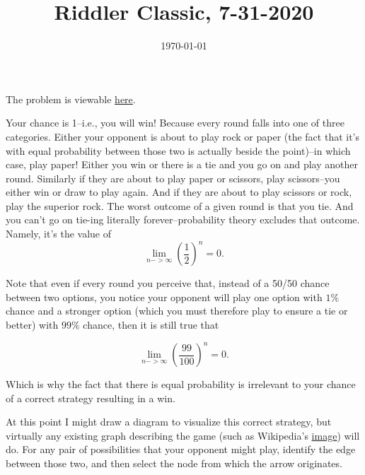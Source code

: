 \documentclass[a4paper,12pt,twoside]{book}
\title{Riddler Classic, 7-31-2020}
\date{\today}
\begin{document}
\maketitle

The problem is viewable \href{https://fivethirtyeight.com/features/can-you-cheat-at-rock-paper-scissors/}{here}.

Your chance is 1--i.e., you will win! Because every round falls into one of three categories. Either your opponent is about to play rock or paper (the fact that it's with equal probability between those two is actually beside the point)--in which case, play paper! Either you win or there is a tie and you go on and play another round. Similarly if they are about to play paper or scissors, play scissors--you either win or draw to play again. And if they are about to play scissors or rock, play the superior rock. The worst outcome of a given round is that you tie. And you can't go on tie-ing literally forever--probability theory excludes that outcome. Namely, it's the value of $$ \lim_{n -> \infty} \left( \frac{1}{2} \right)^{n} = 0.$$

Note that even if every round you perceive that, instead of a 50/50 chance between two options, you notice your opponent will play one option with $1\%$ chance and a stronger option (which you must therefore play to ensure a tie or better) with $99\%$ chance, then it is still true that 

$$ \lim_{n -> \infty} \left( \frac{99}{100} \right)^{n} = 0.$$

Which is why the fact that there is equal probability is irrelevant to your chance of a correct strategy resulting in a win.

At this point I might draw a diagram to visualize this correct strategy, but virtually any existing graph describing the game (such as Wikipedia's \href{https://en.wikipedia.org/wiki/Rock_paper_scissors#/media/File:Rock-paper-scissors.svg}{image}) will do. For any pair of possibilities that your opponent might play, identify the edge between those two, and then select the node from which the arrow originates.
\end{document}
